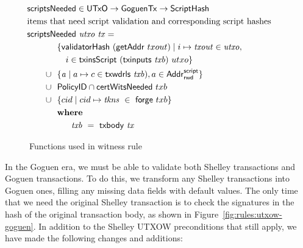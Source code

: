 \begin{figure}[htb]
  \begin{align*}
      & \hspace{-1cm}\fun{scriptsNeeded} \in \UTxO \to \GoguenTx \to \ScriptHash\\
      & \hspace{-1cm}\text{items that need script validation and corresponding script hashes} \\
      &  \hspace{-1cm}\fun{scriptsNeeded}~\var{utxo}~\var{tx} = \\
      & ~~\{ \fun{validatorHash}~(\fun{getAddr}~{txout}) \mid i \mapsto \var{txout} \in \var{utxo},\\
      & ~~~~~i\in\fun{txinsScript}~{(\fun{txinputs}~\var{txb})}~{utxo}\} \\
      \cup & ~~\{ \var{a} \mid a \mapsto c \in \fun{txwdrls}~\var{txb}),
         a\in \AddrRWDScr \} \\
        \cup & ~~\PolicyID \cap \fun{certWitsNeeded}~{txb} \\
        \cup & ~~\{ cid \mid cid \mapsto \var{tkns}~\in~\fun{forge}~{txb} \} \\
      & \where \\
      & ~~~~~~~ \var{txb}~=~\txbody{tx}
  \end{align*}
  \caption{Functions used in witness rule}
  \label{fig:functions-witnesses}
\end{figure}

In the Goguen era, we must be able to validate both Shelley transactions
and Goguen transactions. To do this, we transform any Shelley transactions
into Goguen ones, filling any missing data fields with default values.
The only time that we need the original Shelley transaction is to check the signatures
in the hash of the original transaction body, as shown in
Figure~\ref{fig:rules:utxow-goguen}. In addition to the Shelley UTXOW preconditions
that still apply, we have made the following changes and additions:

